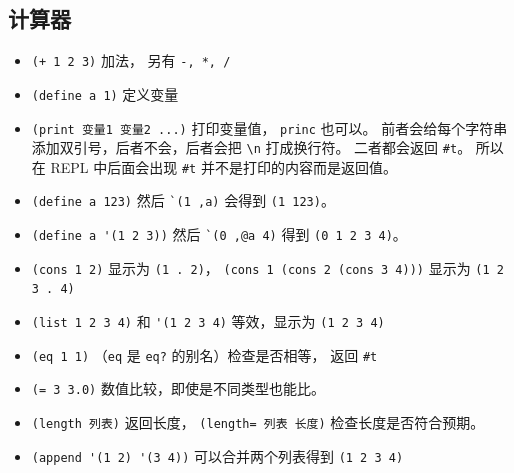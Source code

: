 \subsection{计算器}
\begin{itemize}
\item \verb`(+ 1 2 3)` 加法， 另有 \verb`-, *, /`
\item \verb`(define a 1)` 定义变量
\item \verb`(print 变量1 变量2 ...)` 打印变量值， \verb`princ` 也可以。 前者会给每个字符串添加双引号，后者不会，后者会把 \verb`\n` 打成换行符。 二者都会返回 \verb`#t`。 所以在 REPL 中后面会出现 \verb`#t` 并不是打印的内容而是返回值。
\item \verb`(define a 123)` 然后 \verb|`(1 ,a)| 会得到 \verb`(1 123)`。
\item \verb`(define a '(1 2 3))` 然后 \verb|`(0 ,@a 4)| 得到 \verb`(0 1 2 3 4)`。
\item \verb`(cons 1 2)` 显示为 \verb`(1 . 2)`， \verb`(cons 1 (cons 2 (cons 3 4)))` 显示为 \verb`(1 2 3 . 4)`
\item \verb`(list 1 2 3 4)` 和 \verb`'(1 2 3 4)` 等效，显示为 \verb`(1 2 3 4)`
\item \verb`(eq 1 1)` （\verb`eq` 是 \verb`eq?` 的别名）检查是否相等， 返回 \verb`#t`
\item \verb`(= 3 3.0)` 数值比较，即使是不同类型也能比。
\item \verb`(length 列表)` 返回长度， \verb`(length= 列表 长度)` 检查长度是否符合预期。
\item \verb`(append '(1 2) '(3 4))` 可以合并两个列表得到 \verb`(1 2 3 4)`

\end{itemize}

